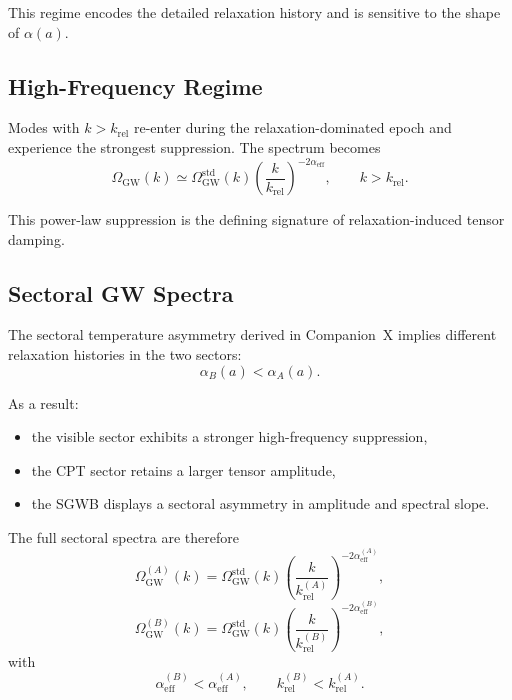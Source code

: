 \documentclass[11pt,a4paper]{article}
\begin{document}
This regime encodes the detailed relaxation history and is sensitive to the shape of $\alpha(a)$.


\subsection{High-Frequency Regime}

Modes with $k > k_{\mathrm{rel}}$ re-enter during the relaxation-dominated epoch and experience
the strongest suppression. The spectrum becomes
\begin{equation}
\Omega_{\mathrm{GW}}(k)
\simeq
\Omega_{\mathrm{GW}}^{\mathrm{std}}(k)
\left( \frac{k}{k_{\mathrm{rel}}} \right)^{-2\alpha_{\mathrm{eff}}},
\qquad
k > k_{\mathrm{rel}}.
\end{equation}

This power-law suppression is the defining signature of relaxation-induced tensor damping.


\subsection{Sectoral GW Spectra}

The sectoral temperature asymmetry derived in Companion~X implies different relaxation
histories in the two sectors:
\begin{equation}
\alpha_{B}(a) < \alpha_{A}(a).
\end{equation}

As a result:

\begin{itemize}
\item the visible sector exhibits a stronger high-frequency suppression,
\item the CPT sector retains a larger tensor amplitude,
\item the SGWB displays a sectoral asymmetry in amplitude and spectral slope.
\end{itemize}

The full sectoral spectra are therefore
\begin{equation}
\Omega_{\mathrm{GW}}^{(A)}(k)
=
\Omega_{\mathrm{GW}}^{\mathrm{std}}(k)
\left( \frac{k}{k_{\mathrm{rel}}^{(A)}} \right)^{-2\alpha_{\mathrm{eff}}^{(A)}},
\end{equation}
\begin{equation}
\Omega_{\mathrm{GW}}^{(B)}(k)
=
\Omega_{\mathrm{GW}}^{\mathrm{std}}(k)
\left( \frac{k}{k_{\mathrm{rel}}^{(B)}} \right)^{-2\alpha_{\mathrm{eff}}^{(B)}},
\end{equation}
with
\begin{equation}
\alpha_{\mathrm{eff}}^{(B)} < \alpha_{\mathrm{eff}}^{(A)},
\qquad
k_{\mathrm{rel}}^{(B)} < k_{\mathrm{rel}}^{(A)}.
\end{equation}
\end{document}
